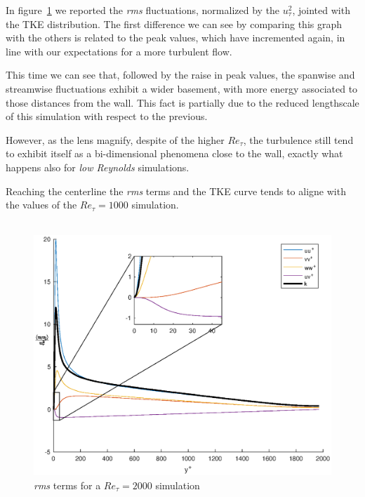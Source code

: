In figure~\ref{budget:2000} we reported the \emph{rms} fluctuations, normalized by the $u_{\tau}^{2}$, jointed with the TKE distribution. The first difference we can see by comparing this graph with the others is related to the peak values, which have incremented again, in line with our expectations for a more turbulent flow. \par
This time we can see that, followed by the raise in peak values, the spanwise and streamwise fluctuations exhibit a wider basement, with more energy   associated to those distances from the wall. This fact is partially due to the reduced lengthscale of this simulation with respect to the previous.\par
However, as the lens magnify, despite of the higher $Re_{\tau}$, the turbulence still tend to exhibit itself as a bi-dimensional phenomena close to the wall, exactly what happens also for \emph{low Reynolds} simulations.\par

Reaching the centerline the \emph{rms} terms and the TKE curve tends to aligne with the values of the $Re_{\tau}=1000$ simulation.\\~\par

\begin{figure}
\begin{center}
\includegraphics[scale=0.55]{grafici/budget+k_2000.eps}
\caption{\emph{rms} terms for a $Re_{\tau}=2000$ simulation}
\label{budget:2000}
\end{center} 
\end{figure}


